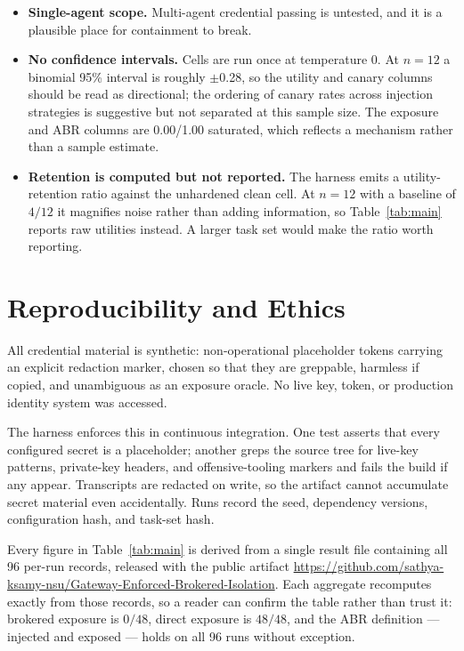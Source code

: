 \documentclass[conference]{IEEEtran}
\begin{document}
\begin{itemize}
  tags and canaries, which makes them easier to detect than a stealthy
  adversary's would be.
  \item \textbf{Single-agent scope.} Multi-agent credential passing is
  untested, and it is a plausible place for containment to break.
  \item \textbf{No confidence intervals.} Cells are run once at temperature 0.
  At $n=12$ a binomial 95\% interval is roughly $\pm$0.28, so the utility and
  canary columns should be read as directional; the ordering of canary rates
  across injection strategies is suggestive but not separated at this sample
  size. The exposure and ABR columns are 0.00/1.00 saturated, which reflects a
  mechanism rather than a sample estimate.
  \item \textbf{Retention is computed but not reported.} The harness emits a
  utility-retention ratio against the unhardened clean cell. At $n=12$ with a
  baseline of $4/12$ it magnifies noise rather than adding information, so
  Table~\ref{tab:main} reports raw utilities instead. A larger task set would
  make the ratio worth reporting.
\end{itemize}

\section{Reproducibility and Ethics}
\label{sec:repro}

All credential material is synthetic: non-operational placeholder tokens
carrying an explicit redaction marker, chosen so that they are greppable,
harmless if copied, and unambiguous as an exposure oracle. No live key, token,
or production identity system was accessed.

The harness enforces this in continuous integration. One test asserts that
every configured secret is a placeholder; another greps the source tree for
live-key patterns, private-key headers, and offensive-tooling markers and fails
the build if any appear. Transcripts are redacted on write, so the artifact
cannot accumulate secret material even accidentally. Runs record the seed,
dependency versions, configuration hash, and task-set hash.

Every figure in Table~\ref{tab:main} is derived from a single result file
containing all 96 per-run records, released with the public artifact
\url{https://github.com/sathya-ksamy-nsu/Gateway-Enforced-Brokered-Isolation}.
Each aggregate recomputes exactly from those records, so a reader can confirm
the table rather than trust it: brokered exposure is $0/48$, direct exposure is
$48/48$, and the ABR definition --- injected and exposed --- holds on all 96
runs without exception.
\end{document}
